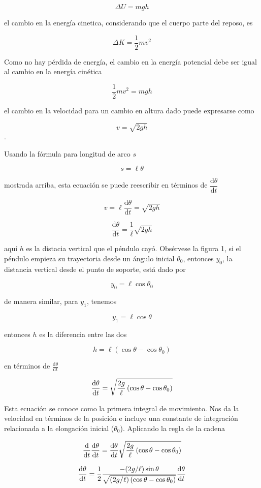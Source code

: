 \documentclass[12pt,spanish]{article}
\begin{document}
    \[\Delta U = mgh\]

el cambio en la energía cinetica, considerando que el cuerpo parte del reposo, es


    \[\Delta K = \frac{1}{2} mv^2 \]

Como no hay pérdida de energía, el cambio en la energía potencial debe ser igual al cambio en la energía cinética

\[\frac{1}{2} mv^2 = mgh\]

el cambio en la velocidad para un cambio en altura dado puede expresarse como

    \[v = \sqrt{2gh}\].

Usando la fórmula para longitud de arco $s$

    \[s = \ell\theta\]

mostrada arriba, esta ecuación se puede reescribir en términos de $\dfrac{\mathrm d \theta}{\mathrm d t}$

    \[v = {\ell}{\frac{\mathrm d \theta}{\mathrm d t}} = \sqrt{2gh}\]

    \[\frac{\mathrm d \theta}{\mathrm d t} = \frac{1}{\ell} \sqrt{2gh}\]

aquí $h$ es la distacia vertical que el péndulo cayó. Obsérvese la figura 1, si el péndulo empieza su trayectoria desde un ángulo inicial $\theta_0$, entonces $y_0$, la distancia vertical desde el punto de soporte, está dado por

    \[y_0 = \ell\cos\theta_0\]

de manera similar, para $y_1$, tenemos

    \[y_1 = \ell\cos\theta\]

entonces $h$ es la diferencia entre las dos

    \[h = \ell\left(\cos\theta-\cos\theta_0\right)\]

en términos de  $\frac{\mathrm d \theta}{\mathrm d t}$

    \[\frac{\mathrm d \theta}{\mathrm d t} = \sqrt{{2g\over \ell}\left(\cos\theta-\cos\theta_0\right)}\]

Esta ecuación se conoce como la primera integral de movimiento. Nos da la velocidad en términos de la posición e incluye una constante de integración relacionada a la elongación inicial ($\theta_0$). Aplicando la regla de la cadena

    \[{\frac{\mathrm d}{\mathrm d t} \frac{\mathrm d \theta}{\mathrm d t} = \frac{\mathrm d \theta}{\mathrm d t}\sqrt{{2g\over \ell}\left(\cos\theta-\cos\theta_0\right)}}\]
    
    \[\frac{\mathrm d \theta}{\mathrm d t} = {1\over 2}{-(2g/\ell) \sin\theta\over\sqrt{(2g/\ell) \left(\cos\theta-\cos\theta_0\right)}}\frac{\mathrm d \theta}{\mathrm d t}\]
    
\end{document}
